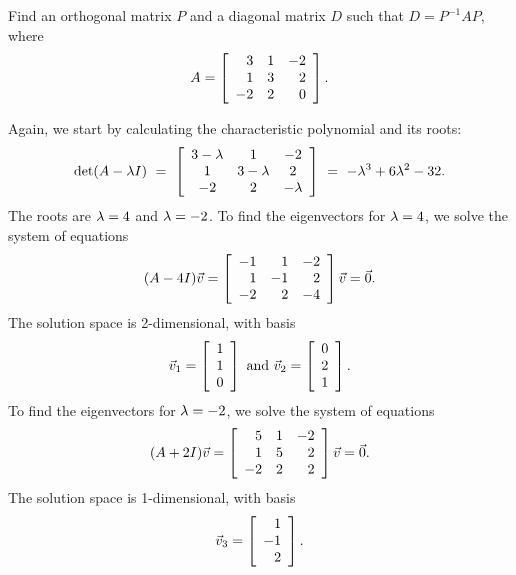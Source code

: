 \documentclass{ximera}
\begin{document}
\begin{example}\label{ex:diagonalization-symmetric2}
  Find an orthogonal matrix $P$ and a diagonal matrix $D$ such that $D =
  P^{-1}AP$, where
  \begin{equation*}
    A = \startmat{rrr}
      3  & 1 & -2 \\
      1  & 3 &  2 \\
      -2 & 2 &  0 \\
    \stopmat.
  \end{equation*}
\end{example}

\begin{solution}
  Again, we start by calculating the characteristic polynomial and its roots:
  \begin{equation*}
    \det(A-\eigenvar I)
    ~=~ \startmat{ccc}
      3-\eigenvar  & 1 & -2 \\
      1  & 3-\eigenvar &  2 \\
      -2 & 2 &  -\eigenvar  \\
    \stopmat
    ~=~ - \eigenvar^3 + 6\eigenvar^2 -32.
  \end{equation*}
  The roots are $\eigenvar=4$ and $\eigenvar=-2$. To find the
  eigenvectors for $\eigenvar=4$, we solve the system of equations
  \begin{equation*}
    (A-4I)\vect{v}
    =
    \startmat{rrr}
      -1  & 1 & -2 \\
      1  & -1 &  2 \\
      -2 & 2 &  -4 \\
    \stopmat\vect{v}
    = \vect{0}.
  \end{equation*}
  The solution space is 2-dimensional, with basis
  \begin{equation*}
    \vect{v}_1 = \startmat{r} 1 \\ 1 \\ 0 \stopmat
    \quad\mbox{and}\quad
    \vect{v}_2 = \startmat{r} 0 \\ 2 \\ 1 \stopmat.
  \end{equation*}
  To find the eigenvectors for $\eigenvar=-2$, we solve the system of
  equations
  \begin{equation*}
    (A+2I)\vect{v}
    =
    \startmat{rrr}
      5  & 1 & -2 \\
      1  & 5 &  2 \\
      -2 & 2 &  2 \\
    \stopmat\vect{v}
    = \vect{0}.
  \end{equation*}
  The solution space is 1-dimensional, with basis
  \begin{equation*}
    \vect{v}_3 = \startmat{r} 1 \\ -1 \\ 2 \stopmat.
  \end{equation*}


\end{solution}
\end{document}
